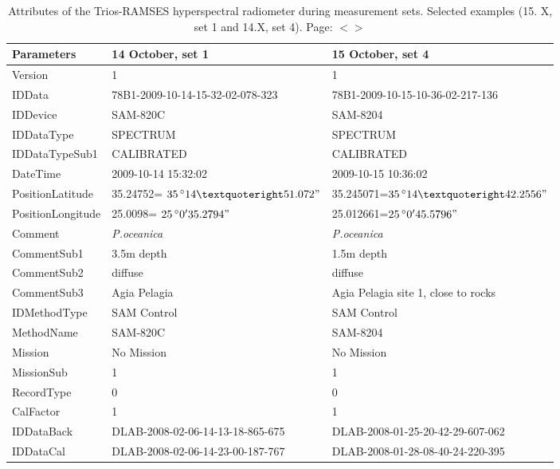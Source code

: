 \documentclass[11pt]{article}
\begin{document}
\begin{appendices}
\begin{table}[H]\footnotesize
	\caption{Attributes of the Trios-RAMSES hyperspectral radiometer during measurement sets. Selected examples (15. X, set 1 and 14.X, set 4). Page: $<$\pageref{page-30}$>$}\label{tab:A.2}	\centering
	\begin{tabular}{| p{3cm} | p{3cm} | p{5cm} |}
	\hline
	    \textbf{Parameters} & \textbf{14 October, set 1} & \textbf{15 October, set 4} \\ \hline \hline
	     Version &1 & 1 \\ \hline
	     IDData & 78B1-2009-10-14-15-32-02-078-323 & 78B1-2009-10-15-10-36-02-217-136 \\ \hline
	     IDDevice & SAM-820C & SAM-8204\\ \hline
	     IDDataType & SPECTRUM & SPECTRUM \\ \hline
	     IDDataTypeSub1 & CALIBRATED & CALIBRATED \\ \hline
	      DateTime & 2009-10-14 15:32:02 & 2009-10-15 10:36:02 \\ \hline
	     PositionLatitude & 35.24752= $35\,^{\circ}14\textquoteright51.072"$ & 35.245071=$35\,^{\circ}14\textquoteright42.2556"$ \\ \hline
	     PositionLongitude & 25.0098= $25\,^{\circ}0'35.2794"$ & 25.012661=$25\,^{\circ}0'45.5796"$ \\ \hline
	     Comment & \textit{P.oceanica} & \textit{P.oceanica} \\ \hline
	     CommentSub1 & 3.5m depth & 1.5m depth \\ \hline
	     CommentSub2 & diffuse & diffuse \\ \hline
	     CommentSub3 & Agia Pelagia & Agia Pelagia site 1, close to rocks \\ \hline
	     IDMethodType & SAM Control & SAM Control \\ \hline
	    MethodName & SAM-820C & SAM-8204 \\ \hline
	    Mission & No Mission & No Mission \\ \hline
	    MissionSub & 1 & 1 \\ \hline
	    RecordType & 0 & 0 \\ \hline
	    CalFactor & 1 & 1 \\ \hline
	   IDDataBack & DLAB-2008-02-06-14-13-18-865-675 & DLAB-2008-01-25-20-42-29-607-062 \\ \hline
	   IDDataCal & DLAB-2008-02-06-14-23-00-187-767 & DLAB-2008-01-28-08-40-24-220-395 \\ \hline

\end{tabular}
\end{table}
\end{appendices}
\end{document}
